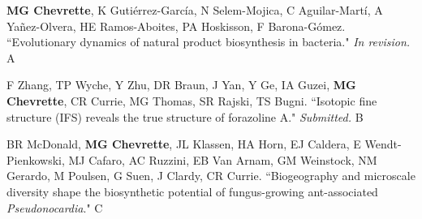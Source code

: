 \begin{cvpubs}

\cvpub
{\textbf{MG Chevrette}, K Guti\'{e}rrez-Garc\'{i}a, N Selem-Mojica, C Aguilar-Mart\'{i}, A Ya\~{n}ez-Olvera, HE Ramos-Aboites, PA Hoskisson, F Barona-G\'{o}mez. ``Evolutionary dynamics of natural product biosynthesis in bacteria." \textit{In revision.}}
{A}

\cvpub
{F Zhang, TP Wyche, Y Zhu, DR Braun, J Yan, Y Ge, IA Guzei, \textbf{MG Chevrette}, CR Currie, MG Thomas, SR Rajski, TS Bugni. ``Isotopic fine structure (IFS) reveals the true structure of forazoline A." \textit{Submitted.}}
{B}

\cvpub
{BR McDonald, \textbf{MG Chevrette}, JL Klassen, HA Horn, EJ Caldera, E Wendt-Pienkowski, MJ Cafaro, AC Ruzzini, EB Van Arnam, GM Weinstock, NM Gerardo, M Poulsen, G Suen, J Clardy, CR Currie. ``Biogeography and microscale diversity shape the biosynthetic potential of fungus-growing ant-associated \textit{Pseudonocardia}." \textit{\textbf{}}}
{C}

\end{cvpubs}


